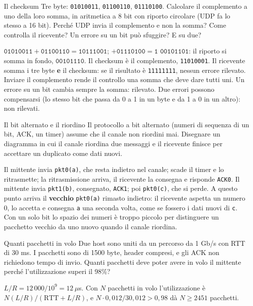 \begin{esercizio}{Il checksum}
Tre byte: \texttt{01010011}, \texttt{01100110}, \texttt{01110100}. Calcolare il complemento a uno della loro somma, in aritmetica a 8 bit
con riporto circolare (UDP fa lo stesso a 16 bit). Perché UDP invia il complemento e non la somma? Come controlla il ricevente? Un errore
su un bit può sfuggire? E su due?

\svolgimento
$\texttt{01010011} + \texttt{01100110} = \texttt{10111001}$; $+ \texttt{01110100} = \texttt{1 00101101}$: il riporto si somma in fondo,
$\texttt{00101110}$. Il checksum è il complemento, \texttt{11010001}. Il ricevente somma i tre byte \textbf{e} il checksum: se il risultato
è \texttt{11111111}, nessun errore rilevato. Inviare il complemento rende il controllo una somma che deve dare tutti uni. Un errore su un bit
cambia sempre la somma: rilevato. Due errori possono compensarsi (lo stesso bit che passa da 0 a 1 in un byte e da 1 a 0 in un altro):
non rilevati.
\end{esercizio}

\begin{esercizio}{Il bit alternato e il riordino}
Il protocollo a bit alternato (numeri di sequenza di un bit, ACK, un timer) assume che il canale non riordini mai. Disegnare un diagramma in
cui il canale riordina due messaggi e il ricevente finisce per accettare un duplicato come dati nuovi.

\svolgimento
Il mittente invia \texttt{pkt0(a)}, che resta indietro nel canale; scade il timer e lo ritrasmette; la ritrasmissione arriva, il
ricevente la consegna e risponde \texttt{ACK0}. Il mittente invia \texttt{pkt1(b)}, consegnato, \texttt{ACK1}; poi \texttt{pkt0(c)}, che
si perde. A questo punto arriva il \textbf{vecchio} \texttt{pkt0(a)} rimasto indietro: il ricevente aspetta un numero 0, lo accetta e
consegna \texttt{a} una seconda volta, come se fossero i dati nuovi di \texttt{c}. Con un solo bit lo spazio dei numeri è troppo piccolo
per distinguere un pacchetto vecchio da uno nuovo quando il canale riordina.
\end{esercizio}

\begin{esercizio}{Quanti pacchetti in volo}
Due host sono uniti da un percorso da 1 Gb/s con RTT di 30 ms. I pacchetti sono di 1500 byte, header compresi, e gli ACK non richiedono
tempo di invio. Quanti pacchetti deve poter avere in volo il mittente perché l'utilizzazione superi il 98\%?

\svolgimento
$L/R = 12\,000/10^9 = 12\ \mu$s. Con $N$ pacchetti in volo l'utilizzazione è $N (L/R) / (\text{RTT} + L/R)$, e
$N \cdot 0{,}012 / 30{,}012 > 0{,}98$ dà $N \geq 2451$ pacchetti.
\end{esercizio}

